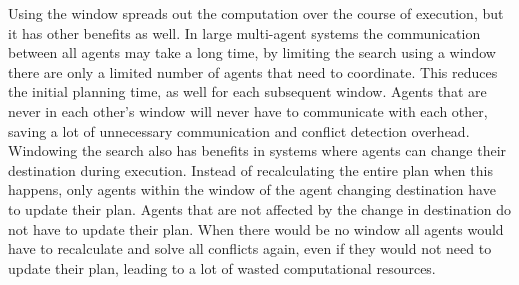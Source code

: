 Using the window spreads out the computation over the course of execution, but
it has other benefits as well. In large multi-agent systems the communication
between all agents may take a long time, by limiting the search using a window
there are only a limited number of agents that need to coordinate. This reduces
the initial planning time, as well for each subsequent window. Agents that are
never in each other's window will never have to communicate with each other,
saving a lot of unnecessary communication and conflict detection overhead.
Windowing the search also has benefits in systems where agents can change their
destination during execution. Instead of recalculating the entire plan when
this happens, only agents within the window of the agent changing destination
have to update their plan. Agents that are not affected by the change in
destination do not have to update their plan. When there would be no window all
agents would have to recalculate and solve all conflicts again, even if they
would not need to update their plan, leading to a lot of wasted computational
resources.